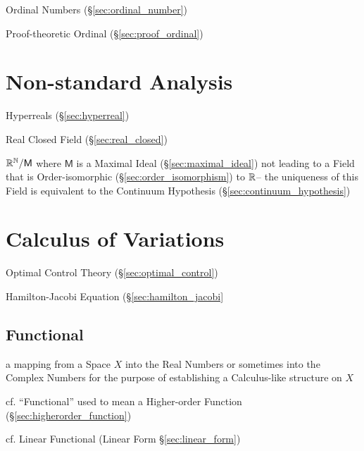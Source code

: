 Ordinal Numbers (\S\ref{sec:ordinal_number})

Proof-theoretic Ordinal (\S\ref{sec:proof_ordinal})



\section{Non-standard Analysis}\label{sec:nonstandard_analysis}

Hyperreals (\S\ref{sec:hyperreal})

Real Closed Field (\S\ref{sec:real_closed})

$\mathbb{R}^{\mathbb{N}} / \mathsf{M}$ where $\mathsf{M}$ is a Maximal Ideal
(\S\ref{sec:maximal_ideal}) not leading to a Field that is
Order-isomorphic (\S\ref{sec:order_isomorphism}) to $\mathbb{R}$-- the
uniqueness of this Field is equivalent to the Continuum Hypothesis
(\S\ref{sec:continuum_hypothesis})



\section{Calculus of Variations}\label{sec:calculus_of_variations}

\fist Optimal Control Theory (\S\ref{sec:optimal_control})

Hamilton-Jacobi Equation (\S\ref{sec:hamilton_jacobi}



\subsection{Functional}\label{sec:functional}

a mapping from a Space $X$ into the Real Numbers or sometimes into the Complex
Numbers for the purpose of establishing a Calculus-like structure on $X$

\fist cf. ``Functional'' used to mean a Higher-order Function
(\S\ref{sec:higherorder_function})

\fist cf. Linear Functional (Linear Form \S\ref{sec:linear_form})

